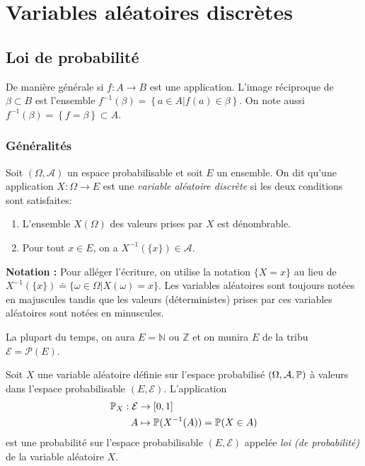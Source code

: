 \chapter[V.A. discrètes]{Variables aléatoires discrètes}

\sld{\vfill\pagebreak[5]}%

\section{Loi de probabilité}

De manière générale si $f:A\to B$ est une application. L'image réciproque de $\beta \subset B$ est l'ensemble $f^{-1}(\beta) = \left\{ a \in A | f(a) \in \beta \right\}$. On note aussi $f^{-1}(\beta) = \left\{ f=\beta \right\} \subset A$.
\pl{\rep{2cm}}

\subsection{Généralités}


\begin{definition}
Soit $(\Omega,\mathcal{A})$ un espace probabilisable et soit $E$ un ensemble. On dit qu'une application $X:\Omega \to E$ est une \emph{variable aléatoire discrète} si les deux conditions sont satisfaites: 
\begin{enumerate}[label=(\roman*)]
	\item L'ensemble $X(\Omega)$ des valeurs prises par $X$ est dénombrable.
	\item Pour tout $x \in E$, on a $X^{-1} (\{x\}) \in \mathcal{A}$.
\end{enumerate}
\end{definition}

{\bf\sffamily Notation :} Pour alléger l'écriture, on utilise la notation $\{X=x\}$ au lieu de $X^{-1} (\{x\}) \doteq \{ \omega\in\Omega| X(\omega) =x \}$. Les variables aléatoires sont toujours notées en majuscules tandis que les valeurs (déterministes) prises par ces variables aléatoires sont notées en minuscules. 

\begin{remark}
	La plupart du temps, on aura $E=\mathbb{N}$ ou $\mathbb{Z}$ et on munira $E$ de la tribu $\mathcal{E}=\mathcal{P}(E)$. 
\end{remark}

\sld{\vfill\pagebreak[5]}%
\begin{defprop}
Soit $X$ une variable aléatoire définie sur l'espace probabilisé $(\Omega,\mathcal{A},\P)$ à valeurs dans l'espace probabilisable $(E,\mathcal{E})$. L'application 
\begin{align*}
	\P_X : \mathcal E & \to [0,1] \\
	A &\mapsto \mathbb{P}(X^{-1}(A)) = \P(X\in A)
\end{align*}
est une probabilité sur l'espace probabilisable $(E,\mathcal{E})$ appelée \emph{loi (de probabilité)} de la variable aléatoire $X$.
\end{defprop}

